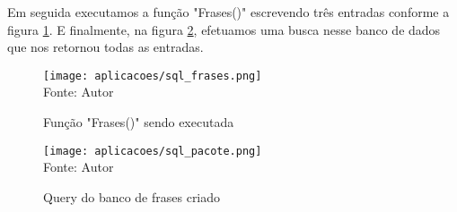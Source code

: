 Em seguida executamos a função "Frases()" escrevendo três entradas conforme a figura \ref{sql_frases}. E finalmente, na figura \ref{sql_query}, efetuamos uma busca nesse banco de dados que nos retornou todas as entradas. 

\begin{figure}[H]
   \begin{center}
       \caption{Função "Frases()" sendo executada} \label{sql_frases}
       \texttt{[image: aplicacoes/sql\_frases.png]} \\
       {\tiny \sf Fonte: Autor}
   \end{center}
\end{figure}

\begin{figure}[H]
   \begin{center}
       \caption{Query do banco de frases criado} \label{sql_query}
       \texttt{[image: aplicacoes/sql\_pacote.png]} \\
       {\tiny \sf Fonte: Autor}
   \end{center}
\end{figure}














